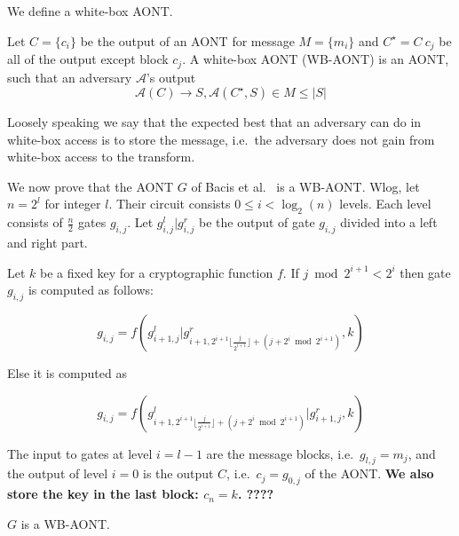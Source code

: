 

We define a white-box AONT.

\begin{defn}
Let $C = \{ c_i \}$ be the output of an AONT for message $M = \{ m_i \}$ and $C^\star = C \ c_j$ be all of the output except block $c_j$.
A white-box AONT (WB-AONT) is an AONT, such that an adversary $\mathcal{A}$'s output
$$ \mathcal{A}(C) \rightarrow S, \mathcal{A}(C^\star, S) \in M \leq |S| $$
\end{defn}

Loosely speaking we say that the expected best that an adversary can do in white-box access is to store the message, i.e.~the adversary does not gain from white-box access to the transform.

We now prove that the AONT $G$ of Bacis et al.~\cite{BacDeC16} is a WB-AONT.
Wlog, let $n = 2^l$ for integer $l$.
Their circuit consists $0 \leq i < \log_2(n)$ levels.
Each level consists of $\frac{n}{2}$ gates $g_{i, j}$.
Let $g^l_{i,j} | g^r_{i, j}$ be the output of gate $g_{i, j}$ divided into a left and right part.

Let $k$ be a fixed key for a cryptographic function $f$.
If $j \bmod 2^{i+1} < 2^i$ then gate $g_{i, j}$ is computed as follows:

$$ g_{i, j} = f(g^l_{i+1, j} | g^r_{i+1, 2^{i+1} \lfloor \frac{j}{2^{i + 1}} \rfloor + (j + 2^i \bmod 2^{i + 1})}, k) $$

Else it is computed as 

$$ g_{i, j} = f(g^l_{i+1, 2^{i+1} \lfloor \frac{j}{2^{i + 1}} \rfloor + (j + 2^i \bmod 2^{i + 1})} | g^r_{i+1, j}, k) $$

The input to gates at level $i = l - 1$ are the message blocks, i.e.~$g_{l, j} = m_j$, and the output of level $i = 0$ is the output $C$, i.e.~$c_j = g_{0, j}$ of the AONT.
{\bf We also store the key in the last block: $c_{n} = k$. ????}

\begin{thm}
$G$ is a WB-AONT.
\end{thm}

